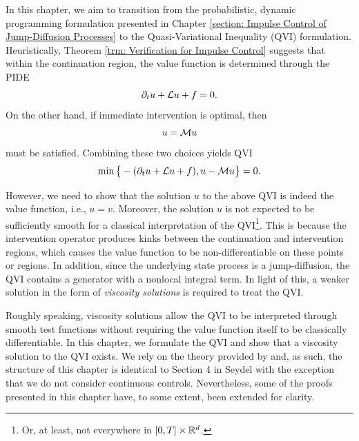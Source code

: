 \label{section: Viscosity Solution for Impulse Control: Existence}
In this chapter, we aim to transition from the probabilistic, dynamic programming formulation presented in Chapter \ref{section: Impulse Control of Jump-Diffusion Processes} to the Quasi-Variational Inequality (QVI) formulation. Heuristically, Theorem \ref{trm: Verification for Impulse Control} suggests that within the continuation region, the value function is determined through the PIDE
\begin{equation*}
    \partial_t u + \mathcal{L} u + f = 0.
\end{equation*}
On the other hand, if immediate intervention is optimal, then
\begin{equation*}
    u = \mathcal{M} u
\end{equation*}
must be satisfied. Combining these two choices yields QVI
\begin{equation*}
    \min \big\{-(\partial_t u + \mathcal{L} u + f), u - \mathcal{M} u \big\} = 0.
\end{equation*}

However, we need to show that the solution $u$ to the above QVI is indeed the value function, i.e., $u=v$. Moreover, the solution $u$ is not expected to be sufficiently smooth for a classical interpretation of the QVI\footnote{Or, at least, not everywhere in $[0,T] \times \mathbb{R}^d$.}. This is because the intervention operator produces kinks between the continuation and intervention regions, which causes the value function to be non-differentiable on these points or regions. In addition, since the underlying state process is a jump-diffusion, the QVI contains a generator with a nonlocal integral term. In light of this, a weaker solution in the form of \textit{viscosity solutions} is required to treat the QVI.

Roughly speaking, viscosity solutions allow the QVI to be interpreted through smooth test functions without requiring the value function itself to be classically differentiable. In this chapter, we formulate the QVI and show that a viscosity solution to the QVI exists. We rely on the theory provided by \textcite{seydel2010generalexistenceuniquenessviscosity} and, as such, the structure of this chapter is identical to Section 4 in Seydel with the exception that we do not consider continuous controls. Nevertheless, some of the proofs presented in this chapter have, to some extent, been extended for clarity. 

